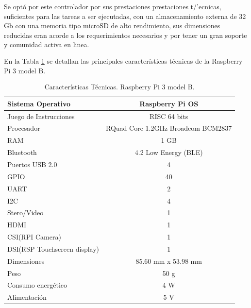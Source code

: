 \begin{itemize}
    Se optó por este controlador por sus prestaciones prestaciones t/'ecnicas, suficientes para las tareas a ser ejecutadas, con un almacenamiento externa de 32 Gb con una memoria tipo microSD de alto rendimiento, sus dimensiones reducidas eran acorde a los requerimientos necesarios y por tener un gran soporte y comunidad activa en linea.
 
    En la Tabla \ref{tab:carac_rasp} se detallan las principales características técnicas de la Raspberry Pi 3 model B.
 
 \begin{table}[t]
      \protect\caption[Características Técnicas. Raspberry Pi 3 model B]{Características Técnicas. Raspberry Pi 3 model B.  \label{tab:carac_rasp}}
    
     \centering
     \begin{tabular}{|l|c|}
        \hline
           Sistema Operativo & Raspberry Pi OS\\
          \hline
          Juego de Instrucciones & RISC 64 bits\\
          \hline
          Procesador & RQuad Core 1.2GHz Broadcom BCM2837\\
          \hline
          RAM  & 1 GB\\
          \hline
          Bluetooth &  4.2 Low Energy (BLE)\\
          \hline
          Puertos USB 2.0 & 4\\
          \hline
          GPIO& 40\\
          \hline
          UART& 2\\
          \hline
          I2C& 4\\
          \hline
          Stero/Video & 1\\
          \hline
          HDMI & 1\\
          \hline
          CSI(RPI Camera) & 1\\
          \hline
          DSI(RSP Touchscreen display) & 1\\
          \hline
          Dimensiones & 85.60 mm x 53.98 mm\\
          \hline
          Peso & 50 g\\
          \hline
          Consumo energ\'etico & 4 W\\
          \hline
          Alimentaci\'on & 5 V\\
          \hline
        

\end{tabular}
\end{table}
\end{itemize}
